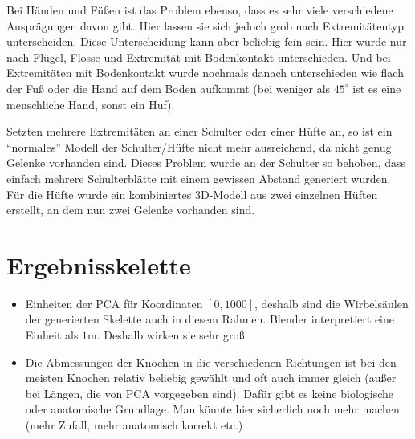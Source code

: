 Bei Händen und Füßen ist das Problem ebenso, dass es sehr viele verschiedene Ausprägungen davon gibt. Hier lassen sie sich jedoch grob nach Extremitätentyp unterscheiden. Diese Unterscheidung kann aber beliebig fein sein. Hier wurde nur nach Flügel, Flosse  und Extremität mit Bodenkontakt unterschieden. Und bei Extremitäten mit Bodenkontakt wurde nochmals danach unterschieden wie flach der Fuß oder die Hand auf dem Boden aufkommt (bei weniger als $45^\circ$ ist es eine menschliche Hand, sonst ein Huf). 

Setzten mehrere Extremitäten an einer Schulter oder einer Hüfte an, so ist ein "`normales"' Modell der Schulter/Hüfte nicht mehr ausreichend, da nicht genug Gelenke vorhanden sind. Dieses Problem wurde an der Schulter so behoben, dass einfach mehrere Schulterblätte mit einem gewissen Abstand generiert wurden. Für die Hüfte wurde ein kombiniertes 3D-Modell aus zwei einzelnen Hüften erstellt, an dem nun zwei Gelenke vorhanden sind.


\section{Ergebnisskelette}

\begin{itemize}
 \item Einheiten der PCA für Koordinaten $[0, 1000]$, deshalb sind die Wirbelsäulen der generierten Skelette auch in diesem Rahmen. Blender interpretiert eine Einheit als $1$m. Deshalb wirken sie sehr groß.
 
 \item Die Abmessungen der Knochen in die verschiedenen Richtungen ist bei den meisten Knochen relativ beliebig gewählt und oft auch immer gleich (außer bei Längen, die von PCA vorgegeben sind). Dafür gibt es keine biologische oder anatomische Grundlage. Man könnte hier sicherlich noch mehr machen (mehr Zufall, mehr anatomisch korrekt etc.)
\end{itemize}

